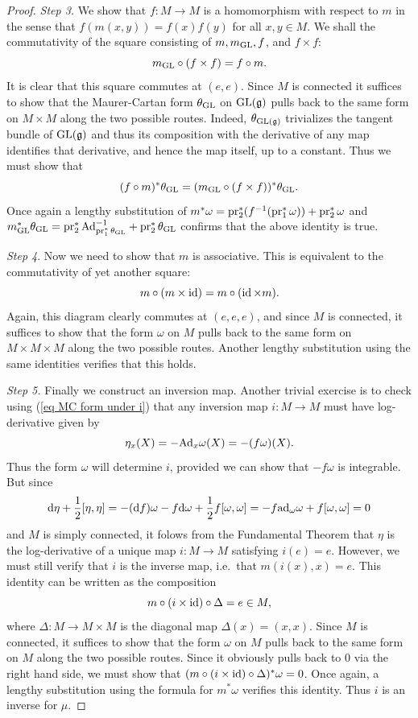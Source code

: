 \begin{proof}
    \emph{Step 3.} We show that $f:M\to M$ is a homomorphism with respect to $m$ in the sense that $f(m(x,y))=f(x)f(y)$ for all $x,y\in M$. We shall the commutativity of the square consisting of $m,m_{\operatorname{GL}},f$, and $f\times f$:
    \[m_{\operatorname{GL}}\circ (f\times f)=f\circ m.\]
    It is clear that this square commutes at $(e,e)$. Since $M$ is connected it suffices to show that the Maurer-Cartan form $\theta_{\operatorname{GL}}$ on $\operatorname{GL}(\mathfrak{g})$ pulls back to the same form on $M\times M$ along the two possible routes. Indeed, $\theta_{\operatorname{GL}(\mathfrak{g})}$ trivializes the tangent bundle of $\operatorname{GL}(\mathfrak{g})$ and thus its composition with the derivative of any map identifies that derivative, and hence the map itself, up to a constant. Thus we must show that
    \[(f\circ m)^\ast\theta_{\operatorname{GL}}=(m_{\operatorname{GL}}\circ (f\times f))^\ast \theta_{\operatorname{GL}}.\]
    Once again a lengthy substitution of $m^\ast\omega=\operatorname{pr}_2^\ast(f^{-1}(\operatorname{pr}_1^\ast\omega))+\operatorname{pr}_2^\ast\omega$ and $m_{\operatorname{GL}}^\ast\theta_{\operatorname{GL}}=\operatorname{pr}_2^\ast \mathrm{Ad}^{-1}_{\operatorname{pr}_1^\ast\theta_{\operatorname{GL}}}+\operatorname{pr}_2^\ast \theta_{\operatorname{GL}}$ confirms that the above identity is true.

    \emph{Step 4}. Now we need to show that $m$ is associative. This is equivalent to the commutativity of yet another square:
    \[m\circ (m\times \operatorname{id})=m\circ (\operatorname{id}\times m).\]
    Again, this diagram clearly commutes at $(e,e,e)$, and since $M$ is connected, it suffices to show that the form $\omega$ on $M$ pulls back to the same form on $M\times M\times M$ along the two possible routes. Another lengthy substitution using the same identities verifies that this holds.

    \emph{Step 5.} Finally we construct an inversion map. Another trivial exercise is to check using (\ref{eq MC form under i}) that any inversion map $i:M\to M$ must have log-derivative given by
    \[\eta_x(X)=-\mathrm{Ad}_x\omega(X)=-(f\omega)(X).\]
    Thus the form $\omega$ will determine $i$, provided we can show that $-f\omega$ is integrable. But since
    \[{\mathrm{d}}\eta+\frac12[\eta,\eta]=-({\mathrm{d}} f)\omega -f{\mathrm{d}} \omega+\frac12 f[\omega,\omega]=-f\mathrm{ad}_\omega\omega +f[\omega,\omega]=0\]
    and $M$ is simply connected, it folows from the Fundamental Theorem that $\eta$ is the log-derivative of a unique map $i:M\to M$ satisfying $i(e)=e$. However, we must still verify that $i$ is the inverse map, i.e.\ that $m(i(x),x)=e$. This identity can be written as the composition
    \[m\circ(i\times\operatorname{id})\circ\Delta=e\in M,\]
    where $\Delta:M\to M\times M$ is the diagonal map $\Delta(x)=(x,x)$. Since $M$ is connected, it suffices to show that the form $\omega$ on $M$ pulls back to the same form on $M$ along the two possible routes. Since it obviously pulls back to $0$ via the right hand side, we must show that $(m\circ(i\times\operatorname{id})\circ\Delta)^\ast\omega=0$. Once again, a lengthy substitution using the formula for $m^\ast\omega$ verifies this identity. Thus $i$ is an inverse for $\mu$.


\end{proof}

